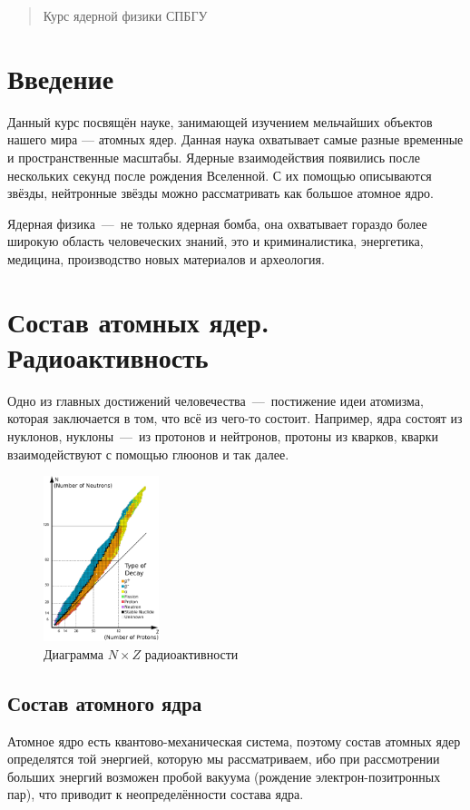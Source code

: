 \documentclass[titlepage]{article}
\begin{document}
\begin{abstract}
Курс ядерной физики СПБГУ 
\end{abstract}

\section{Введение}
Данный курс посвящён науке, занимающей изучением мельчайших объектов нашего мира --- атомных ядер. Данная наука охватывает самые разные временные и пространственные масштабы. Ядерные взаимодействия появились после нескольких секунд после рождения Вселенной. С их помощью описываются звёзды, нейтронные звёзды можно рассматривать как большое атомное ядро. 

\par
Ядерная физика~\----~не только ядерная бомба, она охватывает гораздо более широкую область человеческих знаний, это и криминалистика, энергетика, медицина, производство новых материалов и археология. 

\section{Состав атомных ядер. Радиоактивность}
Одно из главных достижений человечества~\----~постижение идеи атомизма, которая заключается в том, что всё из чего\--то состоит. Например, ядра состоят из нуклонов, нуклоны~\----~из протонов и нейтронов, протоны из кварков, кварки взаимодействуют с помощью глюонов и так далее.

\begin{figure}
\centering
\includegraphics[width=0.3\textwidth]{1.png}
\caption{\label{1}Диаграмма $N \times Z$ радиоактивности}
\end{figure}

\subsection{Состав атомного ядра}
Атомное ядро есть квантово\--механическая система, поэтому состав атомных ядер определятся той энергией, которую мы рассматриваем, ибо при рассмотрении больших энергий возможен пробой вакуума (рождение электрон-позитронных пар), что приводит к неопределённости состава ядра.
\end{document}
